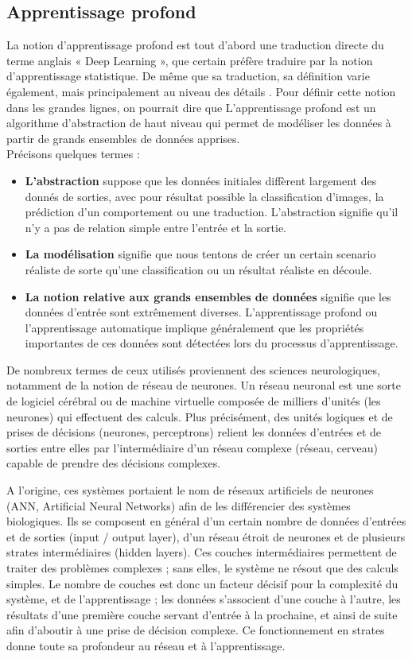 \documentclass[12pt]{article}
\begin{document}
\subsection{Apprentissage profond}
La notion d’apprentissage profond est tout d’abord une traduction directe du terme anglais « Deep Learning », que certain préfère traduire par la notion d’apprentissage statistique. De même que sa traduction, sa définition varie également, mais principalement au niveau des détails \cite{10}. %
Pour définir cette notion dans les grandes lignes, on pourrait dire que L’apprentissage profond est un algorithme d'abstraction de haut niveau qui permet de modéliser les données à partir de grands ensembles de données apprises.\\
Précisons quelques termes \cite{10}:
\begin{itemize}
	\item \textbf{L'abstraction} suppose que les données initiales diffèrent largement des donnés de sorties, avec pour résultat possible la classification d’images, la prédiction d’un comportement ou une traduction. L'abstraction signifie qu'il n'y a pas de relation simple entre l'entrée et la sortie.
	\item \textbf{La modélisation} signifie que nous tentons de créer un certain scenario réaliste de sorte qu'une classification ou un résultat réaliste en découle.
	\item \textbf{La notion relative aux grands ensembles de données} signifie que les données d’entrée sont extrêmement diverses. L'apprentissage profond ou l'apprentissage automatique implique généralement que les propriétés importantes de ces données sont détectées lors du processus d'apprentissage.
\end{itemize}

De nombreux termes de ceux utilisés proviennent des sciences neurologiques, notamment de la notion de réseau de neurones. Un réseau neuronal est une sorte de logiciel cérébral ou de machine virtuelle composée de milliers d’unités (les neurones) qui effectuent des calculs. Plus précisément, des unités logiques et de prises de décisions (neurones, perceptrons) relient les données d’entrées et de sorties entre elles par l’intermédiaire d’un réseau complexe (réseau, cerveau) capable de prendre des décisions complexes.

A l'origine, ces systèmes portaient le nom de réseaux artificiels de neurones (ANN, Artificial Neural Networks) afin de les différencier des systèmes biologiques. Ils se composent en général d’un certain nombre de données d'entrées et de sorties (input / output layer), d’un réseau étroit de neurones et de plusieurs strates intermédiaires (hidden layers). Ces couches intermédiaires permettent de traiter des problèmes complexes ; sans elles, le système ne résout que des calculs simples. Le nombre de couches est donc un facteur décisif pour la complexité du système, et de l’apprentissage ; les données s’associent d’une couche à l’autre, les résultats d’une première couche servant d’entrée à la prochaine, et ainsi de suite afin d’aboutir à une prise de décision complexe. Ce fonctionnement en strates donne toute sa profondeur au réseau et à l’apprentissage.
\end{document}
